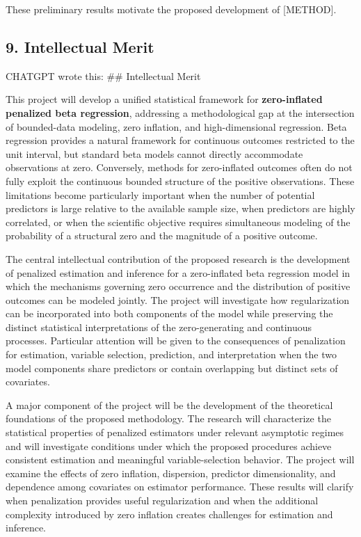 \documentclass[
  11pt,
  letterpaper,
]{article}
\begin{document}
These preliminary results motivate the proposed development of
{[}METHOD{]}.

\subsection{9. Intellectual Merit}\label{intellectual-merit-1}

CHATGPT wrote this: \#\# Intellectual Merit

This project will develop a unified statistical framework for
\textbf{zero-inflated penalized beta regression}, addressing a
methodological gap at the intersection of bounded-data modeling, zero
inflation, and high-dimensional regression. Beta regression provides a
natural framework for continuous outcomes restricted to the unit
interval, but standard beta models cannot directly accommodate
observations at zero. Conversely, methods for zero-inflated outcomes
often do not fully exploit the continuous bounded structure of the
positive observations. These limitations become particularly important
when the number of potential predictors is large relative to the
available sample size, when predictors are highly correlated, or when
the scientific objective requires simultaneous modeling of the
probability of a structural zero and the magnitude of a positive
outcome.

The central intellectual contribution of the proposed research is the
development of penalized estimation and inference for a zero-inflated
beta regression model in which the mechanisms governing zero occurrence
and the distribution of positive outcomes can be modeled jointly. The
project will investigate how regularization can be incorporated into
both components of the model while preserving the distinct statistical
interpretations of the zero-generating and continuous processes.
Particular attention will be given to the consequences of penalization
for estimation, variable selection, prediction, and interpretation when
the two model components share predictors or contain overlapping but
distinct sets of covariates.

A major component of the project will be the development of the
theoretical foundations of the proposed methodology. The research will
characterize the statistical properties of penalized estimators under
relevant asymptotic regimes and will investigate conditions under which
the proposed procedures achieve consistent estimation and meaningful
variable-selection behavior. The project will examine the effects of
zero inflation, dispersion, predictor dimensionality, and dependence
among covariates on estimator performance. These results will clarify
when penalization provides useful regularization and when the additional
complexity introduced by zero inflation creates challenges for
estimation and inference.
\end{document}
